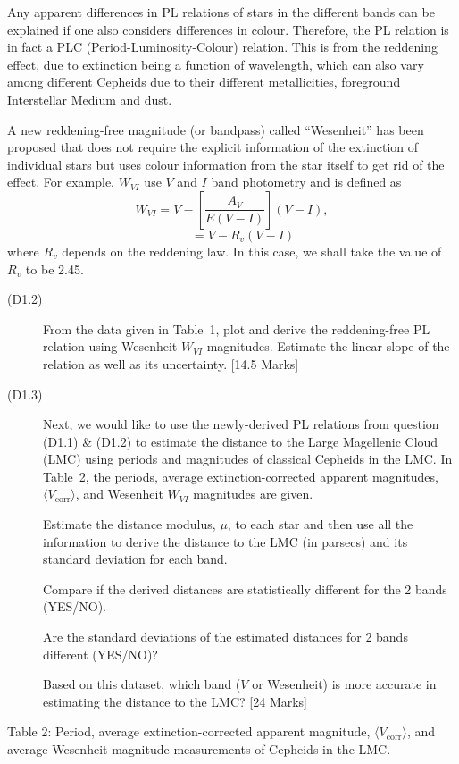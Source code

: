 Any apparent differences in PL relations of stars in the different bands can
be explained if one also considers differences in colour. Therefore, the PL
relation is in fact a PLC (Period-Luminosity-Colour) relation. This is from
the reddening effect, due to extinction being a function of wavelength, which
can also vary among different Cepheids due to their different metallicities,
foreground Interstellar Medium and dust.

A new reddening-free magnitude (or bandpass) called ``Wesenheit'' has been
proposed that does not require the explicit information of the extinction of
individual stars but uses colour information from the star itself to get rid
of the effect. For example, $W_{VI}$ use $V$ and $I$ band photometry and is
defined as
\[ W_{VI} = V - \left[\frac{A_V}{E(V-I)}\right](V-I), \]
\[ \phantom{W_{VI}} = V - R_v (V-I) \]
where $R_v$ depends on the reddening law. In this case, we shall take the
value of $R_v$ to be 2.45.

\begin{description}
\item[(D1.2)] From the data given in Table~1, plot and derive the
  reddening-free PL relation using Wesenheit $W_{VI}$ magnitudes. Estimate the
  linear slope of the relation as well as its uncertainty.
  \hfill[14.5 Marks]
\item[(D1.3)] Next, we would like to use the newly-derived PL relations from
  question (D1.1) \& (D1.2) to estimate the distance to the Large Magellenic
  Cloud (LMC) using periods and magnitudes of classical Cepheids in the LMC.
  In Table~2, the periods, average extinction-corrected apparent magnitudes,
  $\langle V_{\mathrm{corr}}\rangle$, and Wesenheit $W_{VI}$ magnitudes are
  given.

  Estimate the distance modulus, $\mu$, to each star and then use all the
  information to derive the distance to the LMC (in parsecs) and its standard
  deviation for each band.

  Compare if the derived distances are statistically different for the 2 bands
  (YES/NO).

  Are the standard deviations of the estimated distances for 2 bands different
  (YES/NO)?

  Based on this dataset, which band ($V$ or Wesenheit) is more accurate in
  estimating the distance to the LMC? \hfill[24 Marks]
\end{description}

Table 2: Period, average extinction-corrected apparent magnitude,
$\langle V_{\mathrm{corr}}\rangle$, and average Wesenheit magnitude
measurements of Cepheids in the LMC.

